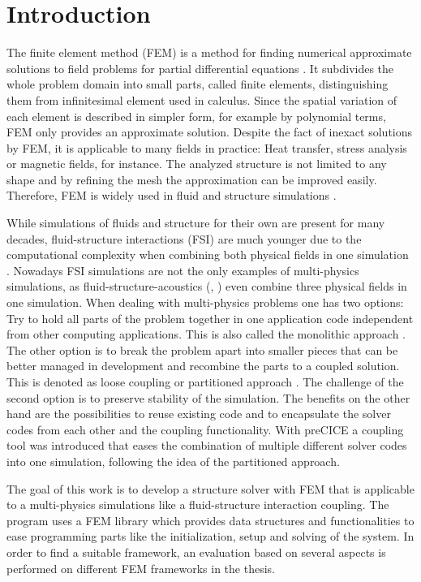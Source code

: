 \section{Introduction}
The finite element method (FEM) is a method for finding numerical approximate solutions to field problems for partial differential equations \cite{cook2002concepts}. It subdivides the whole problem domain into small parts, called finite elements, distinguishing them from infinitesimal element used in calculus. Since the spatial variation of each element is described in simpler form, for example by polynomial terms, FEM only provides an approximate solution. Despite the fact of inexact solutions by FEM, it is applicable to many fields in practice: Heat transfer, stress analysis or magnetic fields, for instance. The analyzed structure is not limited to any shape and by refining the mesh the approximation can be improved easily. Therefore, FEM is widely used in fluid and structure simulations \cite{cook2002concepts}.

While simulations of fluids and structure for their own are present for many decades, fluid-structure interactions (FSI) are much younger due to the computational complexity when combining both physical fields in one simulation \cite{gatzhammer2015efficient}. Nowadays FSI simulations are not the only examples of multi-physics simulations, as fluid-structure-acoustics (\cite{link20092d}, \cite{schafer2010fluid}) even combine three physical fields in one simulation. When dealing with multi-physics problems one has two options: Try to hold all parts of the problem together in one application code independent from other computing applications. This is also called the monolithic approach \cite{gatzhammer2015efficient}. The other option is to break the problem apart into smaller pieces that can be better managed in development and recombine the parts to a coupled solution. This is denoted as loose coupling or partitioned approach \cite{lohner2006extending}. The challenge of the second option is to preserve stability of the simulation. The benefits on the other hand are the possibilities to reuse existing code and to encapsulate the solver codes from each other and the coupling functionality. With preCICE a coupling tool was introduced that eases the combination of multiple different solver codes into one simulation, following the idea of the partitioned approach.

The goal of this work is to develop a structure solver with FEM that is applicable to a multi-physics simulations like a fluid-structure interaction coupling. The program uses a FEM library which provides data structures and functionalities to ease programming parts like the initialization, setup and solving of the system. In order to find a suitable framework, an evaluation based on several aspects is performed on different FEM frameworks in the thesis.

